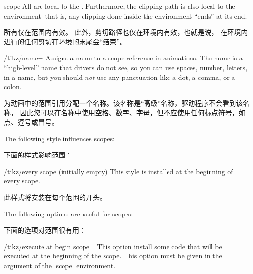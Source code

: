 \begin{environment}{{scope}}
  All  are local to the .
  Furthermore, the clipping path is also local to the environment, that is,
  any clipping done inside the environment ``ends'' at its end.
  
  所有仅在范围内有效。
  此外，剪切路径也仅在环境内有效，也就是说，
  在环境内进行的任何剪切在环境的末尾会“结束”。    
\begin{codeexample}[]
\end{codeexample}

  \begin{key}{/tikz/name=}
      Assigns a name to a scope reference in animations. The name is a
      ``high-level'' name that drivers do not see, so you can use spaces,
      number, letters, in a name, but you should \emph{not} use any
      punctuation like a dot, a comma, or a colon.

      为动画中的范围引用分配一个名称。该名称是“高级”名称，驱动程序不会看到该名称，
      因此您可以在名称中使用空格、数字、字母，但不应使用任何标点符号，如点、逗号或冒号。    
  \end{key}

  The following style influences scopes:
  
  下面的样式影响范围：
%
  \begin{stylekey}{/tikz/every scope (initially \normalfont empty)}
      This style is installed at the beginning of every scope.

      此样式将安装在每个范围的开头。

  \end{stylekey}

  The following options are useful for scopes:

  下面的选项对范围很有用：

  \begin{key}{/tikz/execute at begin scope=}
      This option install some code that will be executed at the beginning of
      the scope. This option must be given in the argument of the |{scope}|
      environment.


\end{key}
\end{environment}
